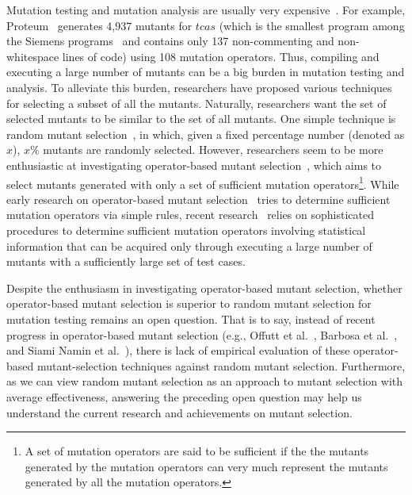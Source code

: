 Mutation testing and mutation analysis are usually very
expensive~\cite{Budd:80b,Mathur:91,Wong:93,Offutt:96,SiamiNamin:08}.
For example, Proteum~\cite{Delamaro:96} generates 4,937 mutants
for $tcas$ (which is the smallest program among the Siemens
programs~\cite{Hutchins:94} and contains only 137 non-commenting
and non-whitespace lines of code) using 108 mutation operators.
Thus, compiling and executing a large number of mutants can be a
big burden in mutation testing and analysis. To alleviate this
burden, researchers have proposed various
techniques~\cite{Acree:79,Mathur:91,Wong:93,Wong:95,Offutt:96,Barbosa:01,SiamiNamin:08}
for selecting a subset of all the mutants. Naturally, researchers
want the set of selected mutants to be similar to the set of all
mutants. One simple technique is random mutant
selection~\cite{Acree:79,Wong:93,Wong:95}, in which, given a fixed
percentage number (denoted as $x$), $x\%$ mutants are randomly
selected. However, researchers seem to be more enthusiastic at
investigating operator-based mutant
selection~\cite{Mathur:91,Wong:93,Wong:95,Offutt:96,Barbosa:01,SiamiNamin:08},
which aims to select mutants generated with only a set of
sufficient mutation operators\footnote{A set of mutation operators
are said to be sufficient if the the mutants generated by the
mutation operators can very much represent the mutants generated
by all the mutation operators.}. While early research on
operator-based mutant selection~\cite{Wong:93,Wong:95,Offutt:96}
tries to determine sufficient mutation operators via simple rules,
recent research~\cite{Barbosa:01,SiamiNamin:08} relies on
sophisticated procedures to determine sufficient mutation
operators involving statistical information that can be acquired
only through executing a large number of mutants with a
sufficiently large set of test cases.

Despite the enthusiasm in investigating operator-based mutant
selection, whether operator-based mutant selection is superior to
random mutant selection for mutation testing remains an open
question. That is to say, instead of recent progress in
operator-based mutant selection (e.g., Offutt et
al.~\cite{Offutt:96}, Barbosa et al.~\cite{Barbosa:01}, and Siami
Namin et al.~\cite{SiamiNamin:08}), there is lack of empirical
evaluation of these operator-based mutant-selection techniques
against random mutant selection. Furthermore, as we can view
random mutant selection as an approach to mutant selection with
average effectiveness, answering the preceding open question may
help us understand the current research and achievements on mutant
selection.

